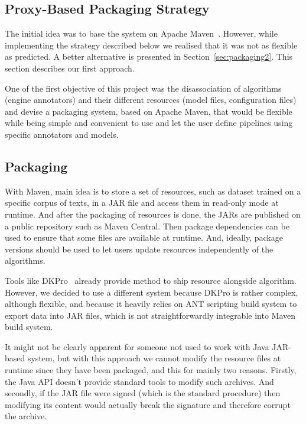 \documentclass{article}
\newcommand{\JAR}{JAR\xspace}
\begin{document}
\clearpage
\begin{appendices}

\section{Proxy-Based Packaging Strategy}
\label{sec:packaging1}

The initial idea was to base the system on Apache Maven~\cite{maven}. However, while implementing the
strategy described below we realised that it was not as flexible as predicted. A better alternative
is presented in Section~\ref{sec:packaging2}. This section describes our first approach.

One of the first objective of this project was the disassociation of algorithms (engine annotators)
and their different resources (model files, configuration files) and devise a packaging system,
based on Apache Maven, that would be flexible while being simple and convenient to use and let the
user define pipelines using specific annotators and models.

\subsection{Packaging}

With Maven, main idea is to store a set of resources, such as dataset trained on a specific corpus
of texts, in a \JAR file and access them in read-only mode at runtime. And after the packaging of
resources is done, the {\JAR}s are published on a public repository such as Maven Central. Then
package dependencies can be used to ensure that some files are available at runtime. And, ideally,
package versions should be used to let users update resources independently of the algorithms.

Tools like DKPro~\cite{dkpro} already provide method to ship resource alongside algorithm. However,
we decided to use a different system because DKPro is rather complex, although flexible, and because
it heavily relies on ANT scripting build system to export data into \JAR files, which is not
straightforwardly integrable into Maven build system.

It might not be clearly apparent for someone not used to work with Java \JAR-based system, but with
this approach we cannot modify the resource files at runtime since they have been packaged, and this
for mainly two reasons. Firstly, the Java API doesn't provide standard tools to modify such
archives.  And secondly, if the \JAR file were signed (which is the standard procedure) then
modifying its content would actually break the signature and therefore corrupt the archive.


\end{appendices}
\end{document}

